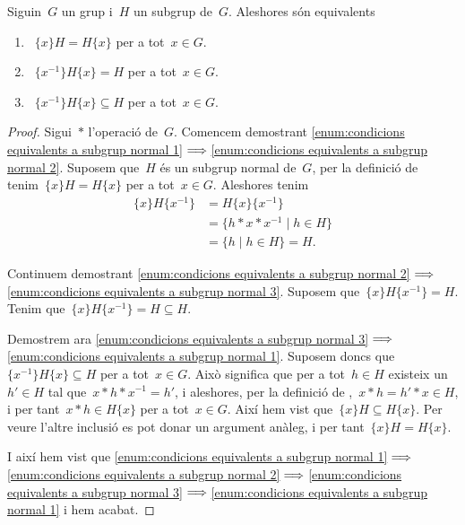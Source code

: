 \documentclass[../../main.tex]{subfiles}
\begin{document}
    \begin{proposition}
        \label{prop:condicions equivalents a subgrup normal}
        Siguin~\(G\) un grup i~\(H\) un subgrup de~\(G\).
        Aleshores són equivalents
        \begin{enumerate}
            \item\label{enum:condicions equivalents a subgrup normal 1}~\(\{x\}H=H\{x\}\) per a tot~\(x\in G\).
            \item\label{enum:condicions equivalents a subgrup normal 2}~\(\{x^{-1}\}H\{x\}=H\) per a tot~\(x\in G\).
            \item\label{enum:condicions equivalents a subgrup normal 3}~\(\{x^{-1}\}H\{x\}\subseteq H\) per a tot~\(x\in G\).
        \end{enumerate}
        \begin{proof}
            Sigui~\(\ast\) l'operació de~\(G\).
            Comencem demostrant \eqref{enum:condicions equivalents a subgrup normal 1}\(\implies\)\eqref{enum:condicions equivalents a subgrup normal 2}.
            Suposem que~\(H\) és un subgrup normal de~\(G\), per la definició de  tenim~\(\{x\}H=H\{x\}\) per a tot~\(x\in G\).
            Aleshores tenim
            \begin{align*}
            \{x\}H\{x^{-1}\}&=H\{x\}\{x^{-1}\}\\
            &=\{h\ast x\ast x^{-1}\mid h\in H\}\\
            &=\{h\mid h\in H\}=H.
            \end{align*}

            Continuem demostrant \eqref{enum:condicions equivalents a subgrup normal 2}\(\implies\)\eqref{enum:condicions equivalents a subgrup normal 3}.
            Suposem que~\(\{x\}H\{x^{-1}\}=H\).
            Tenim que~\(\{x\}H\{x^{-1}\}=H\subseteq H\).

            Demostrem ara \eqref{enum:condicions equivalents a subgrup normal 3}\(\implies\)\eqref{enum:condicions equivalents a subgrup normal 1}.
            Suposem doncs que~\(\{x^{-1}\}H\{x\}\subseteq H\) per a tot~\(x\in G\).
            Això significa que per a tot~\(h\in H\) existeix un~\(h'\in H\) tal que~\(x\ast h\ast x^{-1}=h'\), i aleshores, per la definició de ,~\(x\ast h=h'\ast x\in H\), i per tant~\(x\ast h\in H\{x\}\) per a tot~\(x\in G\).
            Així hem vist que~\(\{x\}H\subseteq H\{x\}\).
            Per veure l'altre inclusió es pot donar un argument anàleg, i per tant~\(\{x\}H= H\{x\}\).

            I així hem vist que \eqref{enum:condicions equivalents a subgrup normal 1}\(\implies\)\eqref{enum:condicions equivalents a subgrup normal 2}\(\implies\)\eqref{enum:condicions equivalents a subgrup normal 3}\(\implies\)\eqref{enum:condicions equivalents a subgrup normal 1} i hem acabat.
        \end{proof}
    \end{proposition}
\end{document}

